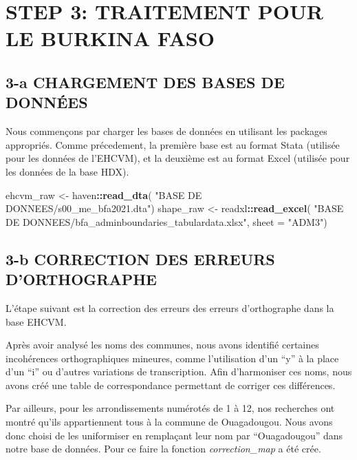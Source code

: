 \documentclass[
]{article}
\newenvironment{Shaded}{\begin{snugshade}}{\end{snugshade}}
\newcommand{\AttributeTok}[1]{\textcolor[rgb]{0.13,0.29,0.53}{#1}}
\newcommand{\FunctionTok}[1]{\textcolor[rgb]{0.13,0.29,0.53}{\textbf{#1}}}
\newcommand{\NormalTok}[1]{#1}
\newcommand{\OtherTok}[1]{\textcolor[rgb]{0.56,0.35,0.01}{#1}}
\newcommand{\SpecialCharTok}[1]{\textcolor[rgb]{0.81,0.36,0.00}{\textbf{#1}}}
\newcommand{\StringTok}[1]{\textcolor[rgb]{0.31,0.60,0.02}{#1}}
\begin{document}
\newpage

\section{STEP 3: TRAITEMENT POUR LE BURKINA
FASO}\label{step-3-traitement-pour-le-burkina-faso}

\subsection{3-a CHARGEMENT DES BASES DE
DONNÉES}\label{a-chargement-des-bases-de-donnuxe9es-1}

Nous commençons par charger les bases de données en utilisant les
packages appropriés. Comme précedement, la première base est au format
Stata (utilisée pour les données de l'EHCVM), et la deuxième est au
format Excel (utilisée pour les données de la base HDX).

\begin{Shaded}
\begin{Highlighting}[]
\NormalTok{ehcvm\_raw }\OtherTok{\textless{}{-}}\NormalTok{ haven}\SpecialCharTok{::}\FunctionTok{read\_dta}\NormalTok{(}
  \StringTok{"BASE DE DONNEES/s00\_me\_bfa2021.dta"}\NormalTok{)}
\NormalTok{shape\_raw }\OtherTok{\textless{}{-}}\NormalTok{ readxl}\SpecialCharTok{::}\FunctionTok{read\_excel}\NormalTok{(}
  \StringTok{"BASE DE DONNEES/bfa\_adminboundaries\_tabulardata.xlsx"}\NormalTok{, }
  \AttributeTok{sheet =} \StringTok{"ADM3"}\NormalTok{)}
\end{Highlighting}
\end{Shaded}

\subsection{3-b CORRECTION DES ERREURS
D'ORTHOGRAPHE}\label{b-correction-des-erreurs-dorthographe}

L'étape suivant est la correction des erreurs des erreurs d'orthographe
dans la base EHCVM.

Après avoir analysé les noms des communes, nous avons identifié
certaines incohérences orthographiques mineures, comme l'utilisation
d'un ``y'' à la place d'un ``i'' ou d'autres variations de
transcription. Afin d'harmoniser ces noms, nous avons créé une table de
correspondance permettant de corriger ces différences.

Par ailleurs, pour les arrondissements numérotés de 1 à 12, nos
recherches ont montré qu'ils appartiennent tous à la commune de
Ouagadougou. Nous avons donc choisi de les uniformiser en remplaçant
leur nom par ``Ouagadougou'' dans notre base de données. Pour ce faire
la fonction \emph{correction\_map} a été crée.
\end{document}
